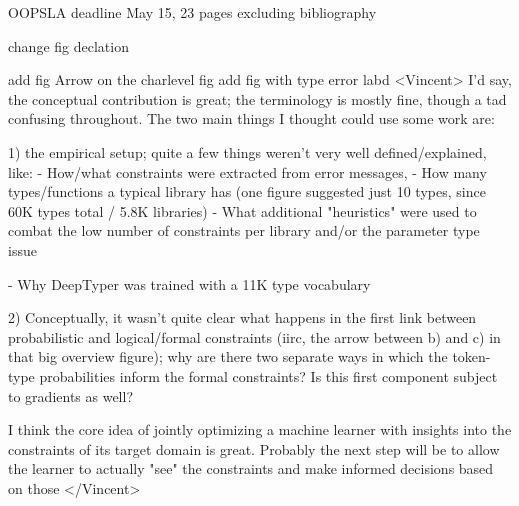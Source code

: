  OOPSLA deadline May 15, 23 pages excluding bibliography

change fig declation


add fig
Arrow on the charlevel fig
add fig with type error labd
<Vincent>
I'd say, the conceptual contribution is great; the terminology is mostly
fine, though a tad confusing throughout. The two main things I thought could
use some work are:

1) the empirical setup; quite a few things weren't very well
defined/explained, like:
  - How/what constraints were extracted from error messages,
  - How many types/functions a typical library has (one figure suggested
just 10 types, since 60K types total / 5.8K libraries)
  - What additional "heuristics" were used to combat the low number of
constraints per library and/or the parameter type issue

  - Why DeepTyper was trained with a 11K type vocabulary
  
2) Conceptually, it wasn't quite clear what happens in the first link
between probabilistic and logical/formal constraints (iirc, the arrow
between b) and c) in that big overview figure); why are there two separate
ways in which the token-type probabilities inform the formal constraints? Is
this first component subject to gradients as well?

I think the core idea of jointly optimizing a machine learner with insights
into the constraints of its target domain is great. Probably the next step
will be to allow the learner to actually "see" the constraints and make
informed decisions based on those </Vincent>
